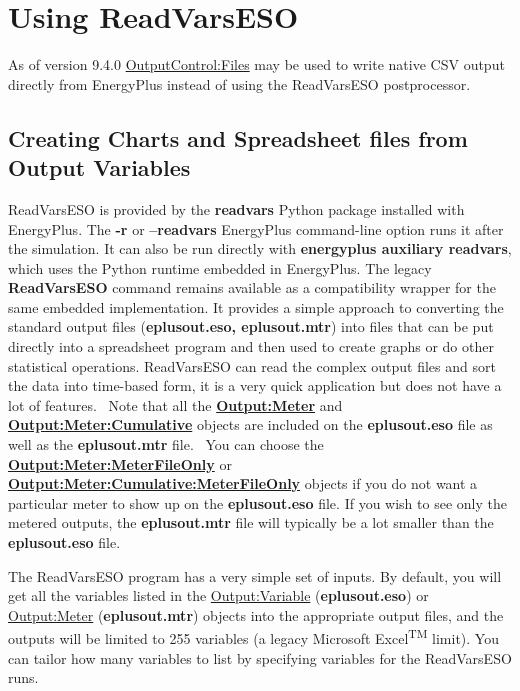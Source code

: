 \section{Using ReadVarsESO}\label{using-readvarseso}
As of version 9.4.0 \hyperref[outputcontrolfiles]{OutputControl:Files} may be used to write native CSV output directly from EnergyPlus instead of using the ReadVarsESO postprocessor.

\subsection{Creating Charts and Spreadsheet files from Output Variables}\label{creating-charts-and-spreadsheet-files-from-output-variables}

ReadVarsESO is provided by the \textbf{readvars} Python package installed with EnergyPlus. The \textbf{-r} or \textbf{--readvars} EnergyPlus command-line option runs it after the simulation. It can also be run directly with \textbf{energyplus auxiliary readvars}, which uses the Python runtime embedded in EnergyPlus. The legacy \textbf{ReadVarsESO} command remains available as a compatibility wrapper for the same embedded implementation. It provides a simple approach to converting the standard output files (\textbf{eplusout.eso, eplusout.mtr}) into files that can be put directly into a spreadsheet program and then used to create graphs or do other statistical operations. ReadVarsESO can read the complex output files and sort the data into time-based form, it is a very quick application but does not have a lot of features.~ Note that all the \textbf{\hyperref[outputmeter-and-outputmetermeterfileonly]{Output:Meter}} and \textbf{\hyperref[outputmetercumulative-and-outputmetercumulativemeterfileonly]{Output:Meter:Cumulative}} objects are included on the \textbf{eplusout.eso} file as well as the \textbf{eplusout.mtr} file.~ You can choose the \textbf{\hyperref[outputmeter-and-outputmetermeterfileonly]{Output:Meter:MeterFileOnly}} or \textbf{\hyperref[outputmetercumulative-and-outputmetercumulativemeterfileonly]{Output:Meter:Cumulative:MeterFileOnly}} objects if you do not want a particular meter to show up on the \textbf{eplusout.eso} file. If you wish to see only the metered outputs, the \textbf{eplusout.mtr} file will typically be a lot smaller than the \textbf{eplusout.eso} file.

The ReadVarsESO program has a very simple set of inputs. By default, you will get all the variables listed in the \hyperref[outputvariable]{Output:Variable} (\textbf{eplusout.eso}) or \hyperref[outputmeter-and-outputmetermeterfileonly]{Output:Meter} (\textbf{eplusout.mtr}) objects into the appropriate output files, and the outputs will be limited to 255 variables (a legacy Microsoft Excel\textsuperscript{TM} limit). You can tailor how many variables to list by specifying variables for the ReadVarsESO runs.

